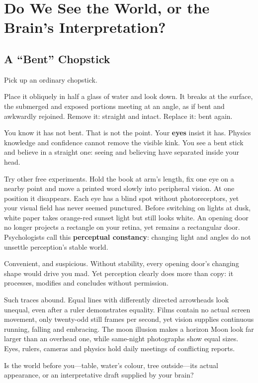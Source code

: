 \chapter[Perception: World or Interpretation?]{Do We See the World, or the Brain's Interpretation?}
\section{A ``Bent'' Chopstick}
Pick up an ordinary chopstick.

Place it obliquely in half a glass of water and look down. It breaks at the surface, the submerged and exposed portions meeting at an angle, as if bent and awkwardly rejoined. Remove it: straight and intact. Replace it: bent again.

You know it has not bent. That is not the point. Your \textbf{eyes} insist it has. Physics knowledge and confidence cannot remove the visible kink. You see a bent stick and believe in a straight one: seeing and believing have separated inside your head.

Try other free experiments. Hold the book at arm's length, fix one eye on a nearby point and move a printed word slowly into peripheral vision. At one position it disappears. Each eye has a blind spot without photoreceptors, yet your visual field has never seemed punctured. Before switching on lights at dusk, white paper takes orange-red sunset light but still looks white. An opening door no longer projects a rectangle on your retina, yet remains a rectangular door. Psychologists call this \textbf{perceptual constancy}: changing light and angles do not unsettle perception's stable world.

Convenient, and suspicious. Without stability, every opening door's changing shape would drive you mad. Yet perception clearly does more than copy: it processes, modifies and concludes without permission.

Such traces abound. Equal lines with differently directed arrowheads look unequal, even after a ruler demonstrates equality. Films contain no actual screen movement, only twenty-odd still frames per second, yet vision supplies continuous running, falling and embracing. The moon illusion makes a horizon Moon look far larger than an overhead one, while same-night photographs show equal sizes. Eyes, rulers, cameras and physics hold daily meetings of conflicting reports.

Is the world before you---table, water's colour, tree outside---its actual appearance, or an interpretative draft supplied by your brain?

